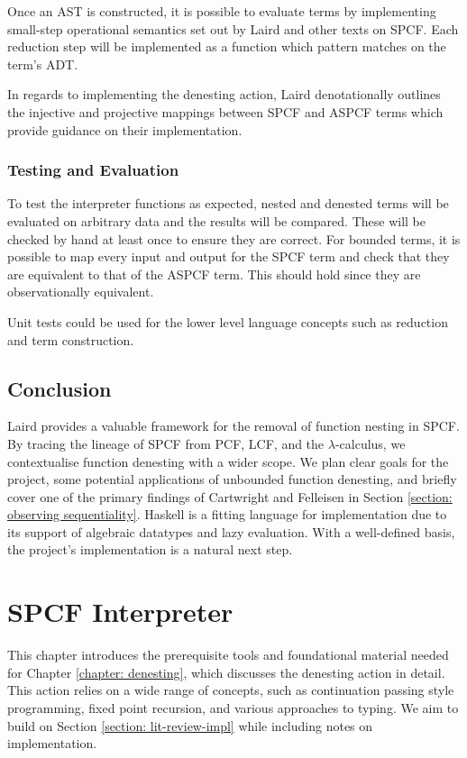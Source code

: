 \documentclass[12pt,a4paper]{report}
\theoremstyle{definition}
\theoremstyle{definition}
\theoremstyle{remark}
\begin{document}
Once an AST is constructed, it is possible to evaluate terms by implementing small-step operational semantics set out by Laird and other texts on SPCF. Each reduction step will be implemented as a function which pattern matches on the term's ADT.

In regards to implementing the denesting action, Laird denotationally outlines the injective and projective mappings between SPCF and ASPCF terms which provide guidance on their implementation.

\subsection{Testing and Evaluation}
To test the interpreter functions as expected, nested and denested terms will be evaluated on arbitrary data and the results will be compared. These will be checked by hand at least once to ensure they are correct. For bounded terms, it is possible to map every input and output for the SPCF term and check that they are equivalent to that of the ASPCF term. This should hold since they are observationally equivalent. 

Unit tests could be used for the lower level language concepts such as reduction and term construction.

\section{Conclusion}
Laird provides a valuable framework for the removal of function nesting in SPCF. By tracing the lineage of SPCF from PCF, LCF, and the $\lambda$-calculus, we contextualise function denesting with a wider scope. We plan clear goals for the project, some potential applications of unbounded function denesting, and briefly cover one of the primary findings of Cartwright and Felleisen in Section \ref{section: observing sequentiality}. Haskell is a fitting language for implementation due to its support of algebraic datatypes and lazy evaluation. With a well-defined basis, the project's implementation is a natural next step.

\chapter{SPCF Interpreter}\label{chapter: interpreter}
This chapter introduces the prerequisite tools and foundational material needed for Chapter \ref{chapter: denesting}, which discusses the denesting action in detail. This action relies on a wide range of concepts, such as continuation passing style programming, fixed point recursion, and various approaches to typing. We aim to build on Section \ref{section: lit-review-impl} while including notes on implementation.
\end{document}
